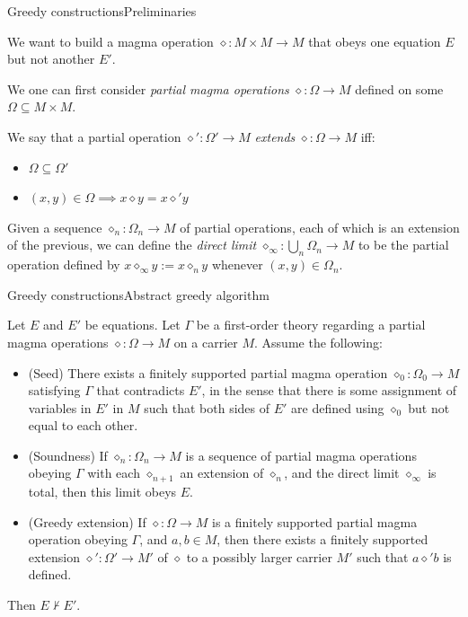 \documentclass{beamer}
\newcommand{\op}{\diamond}
\begin{document}
\begin{frame}{Greedy constructions}{Preliminaries}

We want to build a magma operation $\op \colon M \times M \to M$ that obeys one equation $E$ but not another $E'$.

We one can first consider \emph{partial magma operations} $\op \colon \Omega \to M$ defined on some  $\Omega \subseteq M \times M$.

We say that a partial operation $\op' \colon \Omega' \to M$ \emph{extends} $\op \colon \Omega \to M$ iff:\!
\begin{itemize}
	\item $\Omega \subseteq \Omega'$
	\item $(x, y) \in \Omega \implies x \op y = x \op' y$
\end{itemize}

Given a sequence $\op_n \colon \Omega_n \to M$ of partial operations, each of which is an extension of the previous, we can define the \emph{direct limit} $\op_\infty \colon \bigcup_n \Omega_n \to M$ to be the partial operation defined by $x \op_\infty y := x \op_n y$ whenever $(x,y) \in \Omega_n$.

\end{frame}


\begin{frame}{Greedy constructions}{Abstract greedy algorithm}
	
Let $E$ and $E'$ be equations.
Let $\Gamma$ be a first-order theory regarding a partial magma operations $\op \colon \Omega \to M$ on a carrier $M$.
Assume the following:
\begin{itemize}
	\item (Seed) There exists a finitely supported partial magma operation $\op_0 \colon \Omega_0 \to M$ satisfying $\Gamma$ that contradicts $E'$, in the sense that there is some assignment of variables in $E'$ in $M$ such that both sides of $E'$ are defined using $\op_0$ but not equal to each other.
	\item (Soundness) If $\op_n \colon \Omega_n \to M$ is a sequence of partial magma operations obeying $\Gamma$ with each $\op_{n+1}$ an extension of $\op_n$, and the direct limit $\op_\infty$ is total, then this limit obeys $E$.
	\item (Greedy extension) If $\op \colon \Omega \to M$ is a finitely supported partial magma operation obeying $\Gamma$, and $a,b \in M$, then there exists a finitely supported extension $\op' \colon \Omega' \to M'$ of $\op$ to a possibly larger carrier $M'$ such that $a \op' b$ is defined.
\end{itemize}
Then $E \not\vdash E'$.
	
\end{frame}
\end{document}
